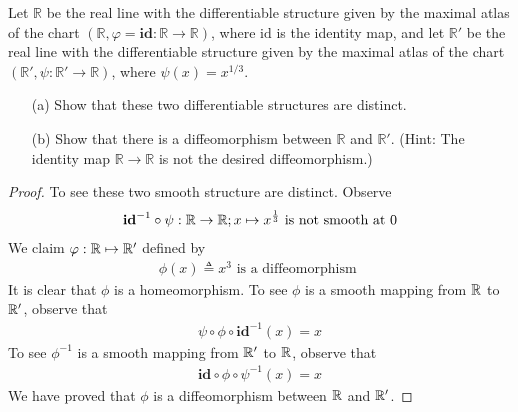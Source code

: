 \documentclass{report}
\begin{document}
\begin{question}{}{}
Let $\mathbb{R}$ be the real line with the differentiable structure given by the maximal atlas of the chart $(\mathbb{R}, \varphi = \textbf{id} : \mathbb{R} \to \mathbb{R})$, where $\text{id}$ is the identity map, and let $\mathbb{R}'$ be the real line with the differentiable structure given by the maximal atlas of the chart $(\mathbb{R}', \psi : \mathbb{R}' \to \mathbb{R})$, where $\psi(x) = x^{1/3}$.
    \begin{enumerate}
        \item[(a)] Show that these two differentiable structures are distinct.
        \item[(b)] Show that there is a diffeomorphism between $\mathbb{R}$ and $\mathbb{R}'$. (Hint: The identity map $\mathbb{R} \to \mathbb{R}$ is not the desired diffeomorphism.)
    \end{enumerate}
\end{question}
\begin{proof}
To see these two smooth structure are distinct. Observe  
\begin{align*}
\textbf{id}^{-1}\circ \psi :\mathbb{R}\rightarrow \mathbb{R};x\mapsto  x^{\frac{1}{3}}\text{ is not smooth at }0
\end{align*}
We claim $\varphi: \mathbb{R}\mapsto  \mathbb{R}'$ defined by 
\begin{align*}
\phi (x)\triangleq x^3\text{ is a diffeomorphism }
\end{align*}
It is clear that $\phi$ is a homeomorphism. To see $\phi$ is a smooth mapping from $\mathbb{R}$ to $\mathbb{R}'$, observe that 
\begin{align*}
\psi\circ \phi\circ \textbf{id}^{-1}(x)=x
\end{align*}
To see $\phi^{-1}$ is a smooth mapping from $\mathbb{R}'$ to  $\mathbb{R}$, observe that 
 \begin{align*}
 \textbf{id}\circ \phi \circ \psi^{-1}(x)=x
\end{align*}
We have proved that $\phi$ is a diffeomorphism between $\mathbb{R}$ and  $\mathbb{R}'$. 
\end{proof}
\end{document}

